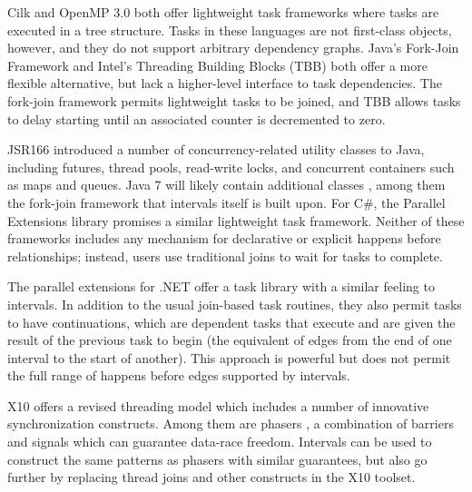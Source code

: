 Cilk \cite{Blumofe1995, Frigo1998} and OpenMP 3.0 \cite{OpenMP2008}
both offer lightweight task frameworks where tasks are executed in a
tree structure.  Tasks in these languages are not first-class objects,
however, and they do not support arbitrary dependency graphs. Java's
Fork-Join Framework \cite{Lea2006, Lea2000, Lea2000a} and Intel's
Threading Building Blocks (TBB) \cite{Reinders2007, Contreras2008}
both offer a more flexible alternative, but lack a higher-level
interface to task dependencies. The fork-join framework permits
lightweight tasks to be joined, and TBB allows tasks to delay starting
until an associated counter is decremented to zero.

JSR166 \cite{Lea2004} introduced a number of concurrency-related
utility classes to Java, including futures, thread pools, read-write
locks, and concurrent containers such as maps and queues. Java 7 will
likely contain additional classes \cite{Lea2006}, among them the
fork-join framework that intervals itself is built upon. For C\#, the
Parallel Extensions \cite{Leijen2009} library promises a similar
lightweight task framework.  Neither of these frameworks includes any
mechanism for declarative or explicit happens before relationships;
instead, users use traditional joins to wait for tasks to complete.

The parallel extensions for .NET \cite{Leijen2009} offer a task
library with a similar feeling to intervals. In addition to the usual
join-based task routines, they also permit tasks to have
continuations, which are dependent tasks that execute and are given
the result of the previous task to begin (the equivalent of edges from
the end of one interval to the start of another). This approach is
powerful but does not permit the full range of happens before edges
supported by intervals.

X10 \cite{Charles2005, Saraswat2010} offers a revised threading model
which includes a number of innovative synchronization
constructs. Among them are phasers \cite{Shirako2008, Shirako2010}, a
combination of barriers and signals which can guarantee data-race
freedom. Intervals can be used to construct the same patterns as
phasers with similar guarantees, but also go further by replacing
thread joins and other constructs in the X10 toolset.

